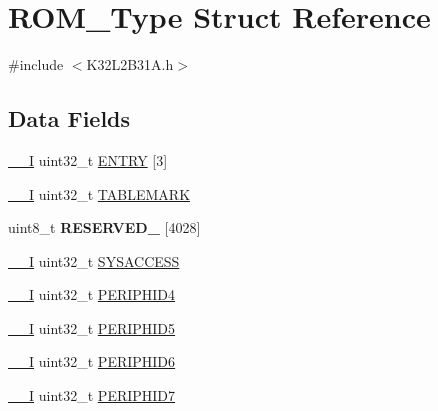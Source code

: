 \hypertarget{struct_r_o_m___type}{}\section{R\+O\+M\+\_\+\+Type Struct Reference}
\label{struct_r_o_m___type}


{\ttfamily \#include $<$K32\+L2\+B31\+A.\+h$>$}

\subsection*{Data Fields}
\begin{DoxyCompactItemize}
\item 
\mbox{\hyperlink{core__cm0plus_8h_af63697ed9952cc71e1225efe205f6cd3}{\+\_\+\+\_\+I}} uint32\+\_\+t \mbox{\hyperlink{struct_r_o_m___type_ab4d8f70e72a5bd04da9248587c74feaf}{E\+N\+T\+RY}} \mbox{[}3\mbox{]}
\item 
\mbox{\hyperlink{core__cm0plus_8h_af63697ed9952cc71e1225efe205f6cd3}{\+\_\+\+\_\+I}} uint32\+\_\+t \mbox{\hyperlink{struct_r_o_m___type_aeabd12dc10a19a2f333e39bb5f329295}{T\+A\+B\+L\+E\+M\+A\+RK}}
\item 
\mbox{\label{struct_r_o_m___type_a0de996dea396cfe98eb44e61dbdff57d}} 
uint8\+\_\+t {\bfseries R\+E\+S\+E\+R\+V\+E\+D\+\_} \mbox{[}4028\mbox{]}
\item 
\mbox{\hyperlink{core__cm0plus_8h_af63697ed9952cc71e1225efe205f6cd3}{\+\_\+\+\_\+I}} uint32\+\_\+t \mbox{\hyperlink{struct_r_o_m___type_a186e457099444315982ffe89d6235393}{S\+Y\+S\+A\+C\+C\+E\+SS}}
\item 
\mbox{\hyperlink{core__cm0plus_8h_af63697ed9952cc71e1225efe205f6cd3}{\+\_\+\+\_\+I}} uint32\+\_\+t \mbox{\hyperlink{struct_r_o_m___type_a6d57dd25c691557286930237edb832ab}{P\+E\+R\+I\+P\+H\+I\+D4}}
\item 
\mbox{\hyperlink{core__cm0plus_8h_af63697ed9952cc71e1225efe205f6cd3}{\+\_\+\+\_\+I}} uint32\+\_\+t \mbox{\hyperlink{struct_r_o_m___type_a97fbe48fa2f04fa8bd5f27b255d5e0ab}{P\+E\+R\+I\+P\+H\+I\+D5}}
\item 
\mbox{\hyperlink{core__cm0plus_8h_af63697ed9952cc71e1225efe205f6cd3}{\+\_\+\+\_\+I}} uint32\+\_\+t \mbox{\hyperlink{struct_r_o_m___type_acd8505982b40f4478a3d82c4e0c884b4}{P\+E\+R\+I\+P\+H\+I\+D6}}
\item 
\mbox{\hyperlink{core__cm0plus_8h_af63697ed9952cc71e1225efe205f6cd3}{\+\_\+\+\_\+I}} uint32\+\_\+t \mbox{\hyperlink{struct_r_o_m___type_ace00880bb4cdd91134d59cd85324c681}{P\+E\+R\+I\+P\+H\+I\+D7}}

\end{DoxyCompactItemize}
